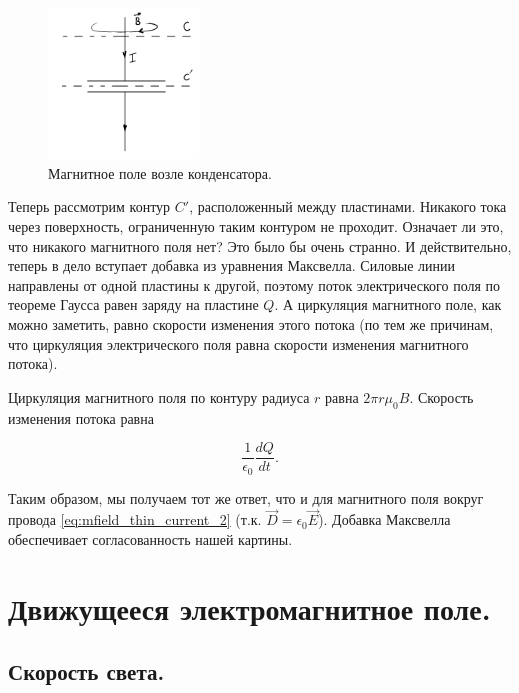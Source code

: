\documentclass[12pt,a4paper]{article}
\numberwithin{equation}{section}
\numberwithin{equation}{section}
\newcommand{\eps}{\epsilon}
\begin{document}
\begin{figure}
  \vspace{-1cm}
  \begin{center}
  \includegraphics[width=4cm]{displacement.pdf}  
  \end{center}
  \vspace{-1cm}
  \caption{Магнитное поле возле конденсатора.}
  \label{fig:displacement}
\end{figure}


Теперь рассмотрим контур $C'$, расположенный между пластинами. Никакого
тока через поверхность, ограниченную таким контуром не
проходит. Означает ли это, что никакого магнитного поля нет? Это было
бы очень странно. И действительно, теперь в дело вступает добавка из
уравнения Максвелла. Силовые линии направлены от одной пластины к
другой, поэтому поток электрического поля по теореме Гаусса равен
заряду на пластине $Q$. А циркуляция магнитного поле, как можно
заметить, равно скорости изменения этого потока (по тем же причинам,
что циркуляция электрического поля равна скорости изменения магнитного
потока). 

Циркуляция магнитного поля по контуру радиуса $r$ равна $2\pi r
\mu_0 B$. Скорость изменения потока равна 

\begin{equation}
  \label{eq:phys_sense_maxwell_1}
  \frac{1}{\eps_0} \frac{dQ}{dt}.
\end{equation}

Таким образом, мы получаем тот же ответ, что и для магнитного поля
вокруг провода \eqref{eq:mfield_thin_current_2} (т.к. $\vec{D} =
\eps_0 \vec{E}$). Добавка Максвелла обеспечивает согласованность нашей
картины.

\section{Движущееся электромагнитное поле. }
\label{sec:moving_plate}

\subsection{Скорость света.}
\label{sec:speed_of_light}
\end{document}
